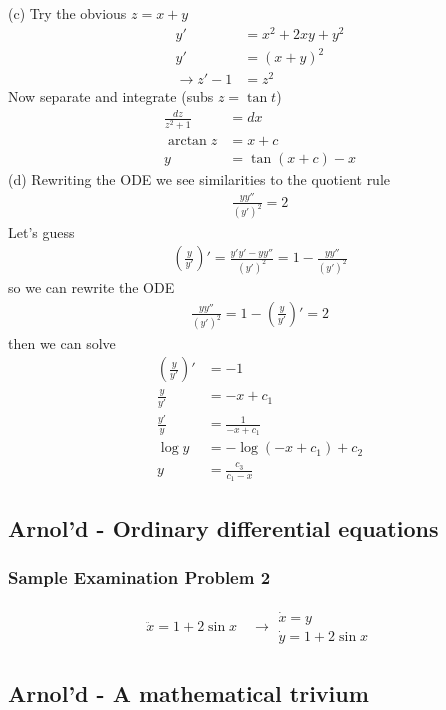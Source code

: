 \documentclass[10pt,a4paper]{book}
\theoremstyle{definition}
\begin{document}
(c) Try the obvious $z=x+y$
\begin{align}
y'&=x^2+2xy+y^2\\
y'&=(x+y)^2\\
\rightarrow z'-1&=z^2
\end{align}
Now separate and integrate (subs $z=\tan t$)
\begin{align}
\frac{dz}{z^2+1}&=dx\\
\arctan z&=x+c\\
y&=\tan(x+c)-x
\end{align}
(d) Rewriting the ODE we see similarities to the quotient rule
\begin{align}
\frac{yy''}{(y')^2}=2
\end{align}
Let's guess
\begin{align}
\left(\frac{y}{y'}\right)'=\frac{y'y'-yy''}{(y')^2}=1-\frac{yy''}{(y')^2}
\end{align}
so we can rewrite the ODE
\begin{align}
\frac{yy''}{(y')^2}=1-\left(\frac{y}{y'}\right)'=2
\end{align}
then we can solve
\begin{align}
\left(\frac{y}{y'}\right)'&=-1\\
\frac{y}{y'}&=-x+c_1\\
\frac{y'}{y}&=\frac{1}{-x+c_1}\\
\log y&=-\log(-x+c_1)+c_2\\
y&=\frac{c_3}{c_1-x}
\end{align}

\subsection{{\sc Arnol'd} - Ordinary differential equations}
\subsubsection{Sample Examination Problem 2}
\begin{align}
\ddot x=1+2\sin x\quad\rightarrow
\begin{array}{l}
\dot x=y\\
\dot y=1+2\sin x
\end{array}
\end{align}

\subsection{{\sc Arnol'd} - A mathematical trivium}
\end{document}
